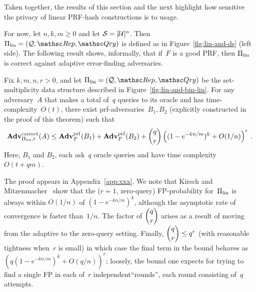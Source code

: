 Taken together, the results of this section and the next highlight how sensitive the privacy of linear PRF-hash constructions is to usage.


For now, let $n,k,m \geq 0$ and let $\mathcal{S}=[{\cal U}]^n$.  Then $\setprim_{\mathrm{lin}}= (\calQ,\Rep, \Qry)$ is defined as in Figure~\ref{fig:lin-and-ds} (left side).  The following result shows, informally, that if~$F$ is a good PRF, then $\Pi_\mathrm{lin}$ is correct against adaptive error-finding adversaries.

\begin{theorem}\label{thm1}\label{thm:lin-correctness}
Fix $k,m,n,r>0$, and let $\setprim_{\mathrm{lin}}= (\calQ,\Rep, \Qry)$ be the set-multiplicity data structure described in Figure~\ref{fig:lin-and-bin-lin}.  For any adversary~$A$ that makes a total of~$q$ queries to its oracle and has time-complexity~$O(t)$, there exist prf-adversaries~$B_1,B_2$ (explicitly constructed in the proof of this theorem) such that
\[
\mathrm{\mathbf{Adv}}^{\mathrm{correct}}_{\Pi_{\mathrm{lin}},r}(A) \leq  \mathbf{Adv}^{\mathrm{prf}}_{F}(B_1) + \mathbf{Adv}^{\mathrm{prf}}_{F}(B_2)  +{\dbinom{q}{r}} \left( (1-e^{-kn/m})^k + O(1/n) \right)^r\,.
\]
Here, $B_1$ and $B_2$, each ask~$q$ oracle queries and have time complexity~$O(t+qm)$.
\end{theorem}
The proof appears in Appendix~\ref{app:xxx}.  We note that Kirsch and Mitzenmacher~\cite{xxx} show
that the ($r=1$, zero-query) FP-probability for~$\Pi_\mathrm{lin}$ is
always within $O(1/n)$ of $(1-e^{-kn/m})^k$, although the asymptotic
rate of convergence is faster than~$1/n$.  The factor of $\dbinom{q}{r}$ arises as a result
of moving from the adaptive to the zero-query setting.  Finally, $\dbinom{q}{r} \leq q^r$ (with
reasonable tightness when~$r$ is small) in which case the final term in the bound behaves as
$(q (1-e^{-kn/m})^k + O(q/n) )^r$; loosely, the bound one expects for
trying to find a single FP in each of~$r$ independent``rounds'', each round
consisting of~$q$ attempts.

